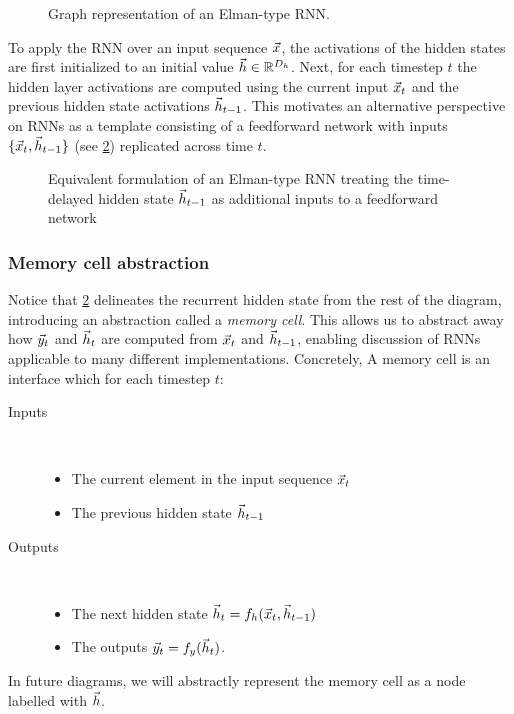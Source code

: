 \begin{figure}[tb]
    \centering
    
    \caption{Graph representation of an Elman-type RNN.}
    \label{fig:nn-rnn}
\end{figure}

To apply the RNN over an input sequence $\vec{x}$, the activations of the hidden
states are first initialized to an initial value $\vec{h} \in \mathbb{R}^{D_{h}}$. Next,
for each timestep $t$ the hidden layer activations are computed using the
current input $\vec{x}_t$ and the previous hidden state activations $\vec{h}_{t-1}$.
This motivates an alternative perspective on RNNs as a template consisting
of a feedforward network with inputs $\{\vec{x}_t, \vec{h}_{t-1}\}$ (see
\cref{fig:rnn-elman}) replicated across time $t$.

\begin{figure}[tb]
  \centering
  
  \caption{Equivalent formulation of an Elman-type RNN treating the
    time-delayed hidden state $\vec{h}_{t-1}$ as additional inputs to a feedforward
  network}
  \label{fig:rnn-elman}
\end{figure}


\subsubsection{Memory cell abstraction}

Notice that \cref{fig:rnn-elman} delineates the recurrent hidden state from
the rest of the diagram, introducing an abstraction called a \emph{memory
cell}. This allows us to abstract away how $\vec{y}_t$ and $\vec{h}_t$ are computed from
$\vec{x}_t$ and $\vec{h}_{t-1}$, enabling discussion of RNNs applicable to many different
implementations. Concretely, A memory cell is an interface which for each
timestep $t$:
\begin{description}
  \item[Inputs]~
    \begin{itemize}
      \item The current element in the input sequence $\vec{x}_t$
      \item The previous hidden state $\vec{h}_{t-1}$
    \end{itemize}
  \item[Outputs]~
    \begin{itemize}
      \item The next  hidden state $\vec{h}_t = f_h (\vec{x}_t, \vec{h}_{t-1})$
      \item The outputs $\vec{y}_t = f_y (\vec{h}_t)$.
    \end{itemize}
\end{description}
In future diagrams, we will abstractly represent the memory cell
as a node labelled with $\vec{h}$.

